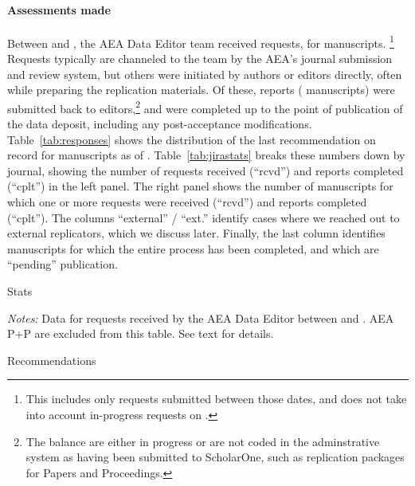 \documentclass[PP]{AEA}
\begin{document}
\paragraph{Assessments made}

Between \firstday{} and \lastday{}, the AEA Data Editor team  received
\jiraissues{} requests,  for \jiramcs{} manuscripts.%
%
\footnote{This includes only requests submitted between those dates, and does not take into account in-progress requests on \firstday{}.}
%
Requests typically are channeled to the team by the AEA's journal submission and review system, but others were initiated by authors or editors directly, often while preparing the replication materials. Of these,  \jiraissuescplt{} reports (\jiramcscplt{} manuscripts) were submitted back to editors,\footnote{The balance are either in progress or are not coded in the adminstrative system as having been submitted to ScholarOne, such as replication packages for Papers and Proceedings.} and \jiramcspending{} were completed up to the point of publication of the data deposit, including any post-acceptance modifications.  Table~\ref{tab:responses} shows the distribution of the last recommendation on record for manuscripts as of \lastday{}.  Table~\ref{tab:jirastats} breaks these numbers down by journal, showing the number of requests received (``rcvd'') and  reports completed (``cplt'') in the left panel. The right panel shows the number of manuscripts for which one or more requests were received (``rcvd'') and reports completed (``cplt''). The columns ``external'' / ``ext.'' identify cases where we reached out to external replicators, which we discuss later. Finally, the last column identifies manuscripts for which the entire process has been completed, and which are ``pending'' publication.
%

\begin{table}[]
    \caption{Stats}
    \label{tab:jirastats}
    \small
    \begin{threeparttable}
    \centering
    
    \begin{tablenotes}
    \item[] \textit{Notes:} Data for requests received by the AEA Data Editor between \firstday{} and \lastday{}. AEA P+P are excluded from this table. See text for details.
    \end{tablenotes}
 \end{threeparttable}
   \end{table}

\begin{table}[t]
    \caption{Recommendations}
    \label{tab:responses}
    \centering
    
\end{table}
\end{document}
